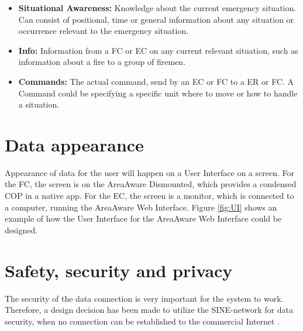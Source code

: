 \begin{itemize}
	\item \textbf{Situational Awareness:} Knowledge about the current emergency situation. Can consist of positional, time or general information about any situation or occurrence relevant to the emergency situation.
	\item \textbf{Info:} Information from a FC or EC on any current relevant situation, such as information about a fire to a group of firemen.
	\item \textbf{Commands:} The actual command, send by an EC or FC to a ER or FC. A Command could be specifying a specific unit where to move or how to handle a situation.
\end{itemize}

\section{Data appearance}
Appearance of data for the user will happen on a User Interface on a screen. For the FC, the screen is on the AreaAware Dismounted, which provides a condensed COP in a native app. For the EC, the screen is a monitor, which is connected to a computer, running the AreaAware Web Interface. Figure \ref{fig:UI} shows an example of how the User Interface for the AreaAware Web Interface could be designed. 


\section{Safety, security and privacy}
The security of the data connection is very important for the system to work. Therefore, a design decision has been made to utilize the SINE-network for data security, when no connection can be established to the commercial Internet \citep{SINE_artikel}. 

